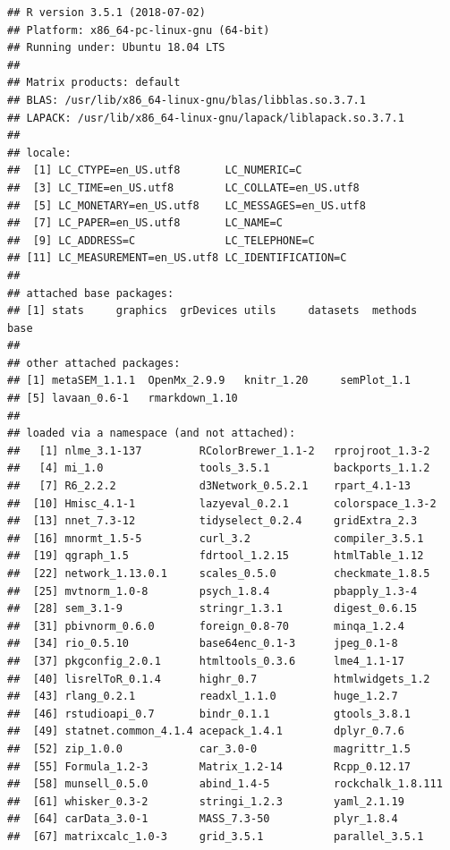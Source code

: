 \documentclass[]{article}
\begin{document}
\begin{verbatim}
## R version 3.5.1 (2018-07-02)
## Platform: x86_64-pc-linux-gnu (64-bit)
## Running under: Ubuntu 18.04 LTS
## 
## Matrix products: default
## BLAS: /usr/lib/x86_64-linux-gnu/blas/libblas.so.3.7.1
## LAPACK: /usr/lib/x86_64-linux-gnu/lapack/liblapack.so.3.7.1
## 
## locale:
##  [1] LC_CTYPE=en_US.utf8       LC_NUMERIC=C             
##  [3] LC_TIME=en_US.utf8        LC_COLLATE=en_US.utf8    
##  [5] LC_MONETARY=en_US.utf8    LC_MESSAGES=en_US.utf8   
##  [7] LC_PAPER=en_US.utf8       LC_NAME=C                
##  [9] LC_ADDRESS=C              LC_TELEPHONE=C           
## [11] LC_MEASUREMENT=en_US.utf8 LC_IDENTIFICATION=C      
## 
## attached base packages:
## [1] stats     graphics  grDevices utils     datasets  methods   base     
## 
## other attached packages:
## [1] metaSEM_1.1.1  OpenMx_2.9.9   knitr_1.20     semPlot_1.1   
## [5] lavaan_0.6-1   rmarkdown_1.10
## 
## loaded via a namespace (and not attached):
##   [1] nlme_3.1-137         RColorBrewer_1.1-2   rprojroot_1.3-2     
##   [4] mi_1.0               tools_3.5.1          backports_1.1.2     
##   [7] R6_2.2.2             d3Network_0.5.2.1    rpart_4.1-13        
##  [10] Hmisc_4.1-1          lazyeval_0.2.1       colorspace_1.3-2    
##  [13] nnet_7.3-12          tidyselect_0.2.4     gridExtra_2.3       
##  [16] mnormt_1.5-5         curl_3.2             compiler_3.5.1      
##  [19] qgraph_1.5           fdrtool_1.2.15       htmlTable_1.12      
##  [22] network_1.13.0.1     scales_0.5.0         checkmate_1.8.5     
##  [25] mvtnorm_1.0-8        psych_1.8.4          pbapply_1.3-4       
##  [28] sem_3.1-9            stringr_1.3.1        digest_0.6.15       
##  [31] pbivnorm_0.6.0       foreign_0.8-70       minqa_1.2.4         
##  [34] rio_0.5.10           base64enc_0.1-3      jpeg_0.1-8          
##  [37] pkgconfig_2.0.1      htmltools_0.3.6      lme4_1.1-17         
##  [40] lisrelToR_0.1.4      highr_0.7            htmlwidgets_1.2     
##  [43] rlang_0.2.1          readxl_1.1.0         huge_1.2.7          
##  [46] rstudioapi_0.7       bindr_0.1.1          gtools_3.8.1        
##  [49] statnet.common_4.1.4 acepack_1.4.1        dplyr_0.7.6         
##  [52] zip_1.0.0            car_3.0-0            magrittr_1.5        
##  [55] Formula_1.2-3        Matrix_1.2-14        Rcpp_0.12.17        
##  [58] munsell_0.5.0        abind_1.4-5          rockchalk_1.8.111   
##  [61] whisker_0.3-2        stringi_1.2.3        yaml_2.1.19         
##  [64] carData_3.0-1        MASS_7.3-50          plyr_1.8.4          
##  [67] matrixcalc_1.0-3     grid_3.5.1           parallel_3.5.1      

\end{verbatim}
\end{document}
